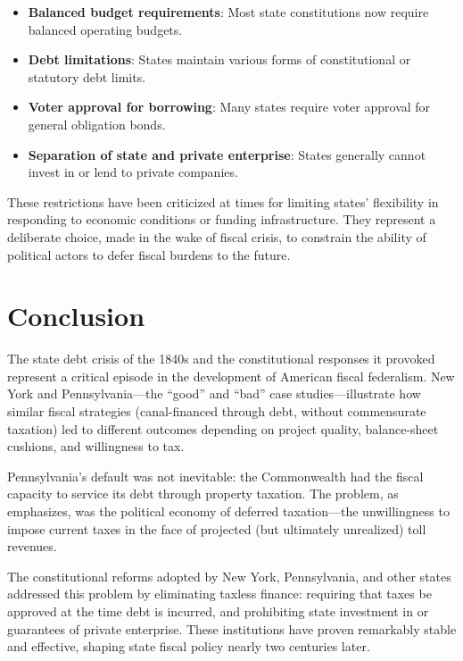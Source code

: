\documentclass[11pt]{article}
\begin{document}
\begin{itemize}
  \item \textbf{Balanced budget requirements}: Most state constitutions now
    require balanced operating budgets.
  \item \textbf{Debt limitations}: States maintain various forms of
    constitutional or statutory debt limits.
  \item \textbf{Voter approval for borrowing}: Many states require voter
    approval for general obligation bonds.
  \item \textbf{Separation of state and private enterprise}: States generally
    cannot invest in or lend to private companies.
\end{itemize}

These restrictions have been criticized at times for limiting states' flexibility
in responding to economic conditions or funding infrastructure.  They represent 
a deliberate choice, made in the wake of fiscal crisis, to constrain the ability
of political actors to defer fiscal burdens to the future.

\section{Conclusion}
\label{sec:conclusion}

The state debt crisis of the 1840s and the constitutional responses it provoked
represent a critical episode in the development of American fiscal federalism.
New York and Pennsylvania---the ``good'' and ``bad'' case studies---illustrate
how similar fiscal strategies (canal-financed through debt, without commensurate
taxation) led to different outcomes depending on project quality, balance-sheet
cushions, and willingness to tax.

Pennsylvania's default was not inevitable: the Commonwealth had the fiscal
capacity to service its debt through property taxation.  The problem, as
\citet{wallis2004sovereign} emphasizes, was the political economy of deferred
taxation---the unwillingness to impose current taxes in the face of projected
(but ultimately unrealized) toll revenues.

The constitutional reforms adopted by New York, Pennsylvania, and other states
addressed this problem by eliminating taxless finance: requiring that taxes be
approved at the time debt is incurred, and prohibiting state investment in or
guarantees of private enterprise.  These institutions have proven remarkably
stable and effective, shaping state fiscal policy nearly two centuries later.
\end{document}

